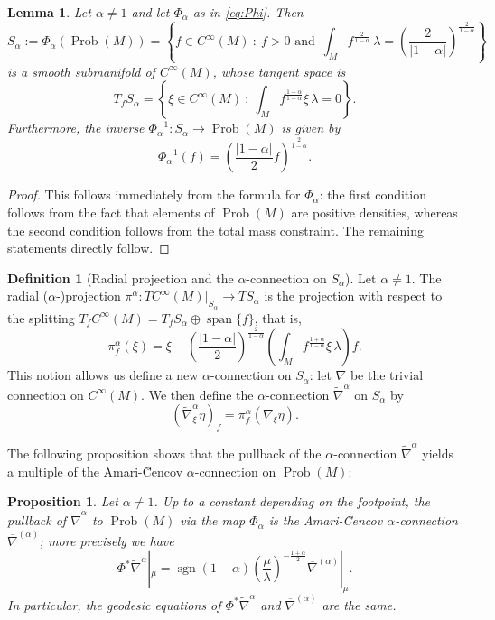\documentclass[11pt,reqno]{amsart}
\newtheorem{lemma}[theorem]{Lemma}
\newtheorem{proposition}[theorem]{Proposition}
\theoremstyle{definition}
\newtheorem{definition}[theorem]{Definition}
\newcommand{\Prob}{\operatorname{Prob}(M)}
\begin{document}
\begin{lemma}
    Let $\alpha\ne 1$ and let $\Phi_{\alpha}$ as in \eqref{eq:Phi}.
    Then
    \[
    S_\alpha:=\Phi_{\alpha}(\Prob) = \left\{ f\in C^\infty(M) ~:~ f>0\text{ and } \, \int_M f^{\frac{2}{1-\alpha}}\, \lambda = \left(\frac{2}{|1-\alpha|}\right)^{\frac{2}{1-\alpha}}\right\}
    \]
    is a smooth submanifold of $C^\infty(M)$, %
    whose tangent space is
    \[
    T_f S_\alpha = \left\{ \xi \in C^\infty(M) ~:~ \int_M f^{\frac{1+\alpha}{1-\alpha}}\xi \,\lambda = 0 \right\}.
    \]
    Furthermore, the inverse $\Phi^{-1}_{\alpha}:S_\alpha\to\Prob $ is given by
    \begin{equation*}
    \Phi^{-1}_{\alpha}(f)=\left(\frac{|1-\alpha|}{2}f\right)^{\frac{2}{1-\alpha}}.
    \end{equation*}
\end{lemma}

\begin{proof}
This follows immediately from the formula for $\Phi_{\alpha}$: the first condition follows from the fact that elements of $\Prob$ are positive densities, whereas the second condition follows from the total mass constraint.  The remaining statements directly follow.
\end{proof}



\begin{definition}[Radial projection and the $\alpha$-connection on $S_\alpha$]
    Let $\alpha\neq 1$. The radial ($\alpha$-)projection $\pi^\alpha : TC^\infty(M)|_{S_\alpha} \to TS_\alpha$ is the projection with respect to the splitting
    $ T_fC^\infty(M) = T_fS_\alpha \oplus \operatorname{span}\{f\}$, that is,
    \[
    \pi_f^\alpha(\xi) = \xi - \left(\frac{|1-\alpha|}{2}\right)^{\frac{2}{1-\alpha}}\left(\int_M f^{\frac{1+\alpha}{1-\alpha}} \xi \,\lambda \right) f.
    \]
    This notion allows us define a new $\alpha$-connection on $S_\alpha$: 
    let $\nabla$ be the trivial connection on $C^\infty(M)$.
    We then define the $\alpha$-connection $\tilde{\nabla}^\alpha$ on $S_\alpha$ by
    \[
    (\tilde{\nabla}^\alpha_\xi \eta)_f = \pi^\alpha_f (\nabla_\xi \eta).
    \]
\end{definition}
The following proposition shows that the pullback of the $\alpha$-connection $\tilde{\nabla}^\alpha$ yields a multiple of the Amari-\u{C}encov $\alpha$-connection on $\Prob$:

\begin{proposition}
    Let $\alpha\neq 1$. Up to a constant depending on the footpoint, the pullback of $\tilde{\nabla}^\alpha$ to $\Prob$ via the map $\Phi_{\alpha}$ is the Amari-\u{C}encov $\alpha$-connection $\overline{\nabla}^{(\alpha)}$; more precisely we have
    \[
    \Phi^* \tilde{\nabla}^\alpha |_\mu = \operatorname{sgn}(1-\alpha)\left(\frac{\mu}{\lambda}\right)^{-\frac{1+\alpha}{2}} \overline{\nabla}^{(\alpha)}|_\mu.
    \]
    In particular, the geodesic equations of $\Phi^* \tilde{\nabla}^\alpha$ and $\overline{\nabla}^{(\alpha)}$ are the same.
\end{proposition}
\end{document}
